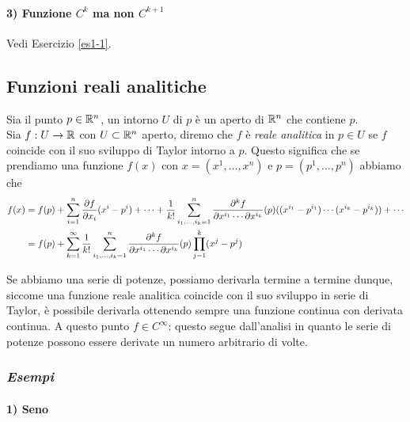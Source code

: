 \paragraph{3) Funzione $ C^{k} $ ma non $ C^{k+1} $}

Vedi Esercizio \ref{es1-1}.

\subsection{Funzioni reali analitiche}

Sia il punto $ p \in \mathbb{R}^{n} $, un intorno $ U $ di $ p $ è un aperto di $ \mathbb{R}^{n} $ che contiene $ p $.\\
Sia $ f : U \to \mathbb{R} $ con $ U \subset \mathbb{R}^{n} $ aperto, diremo che $ f $ è \textit{reale analitica} in $ p \in U $ se $ f $ coincide con il suo sviluppo di Taylor intorno a $ p $. Questo significa che se prendiamo una funzione $ f (x) $ con $ x = (x^{1}, \dots, x^{n}) $ e $ p = (p^{1}, \dots, p^{n}) $ abbiamo che
\begin{align}
	\begin{split}
		f (x) &= f (p) + \sum_{i=1}^{n} \pdv{f}{x_{i}} (p) (x^{i} - p^{i}) + \cdots + \dfrac{1}{k!} \sum_{i_{1},\dots,i_{k}=1}^{n} \dfrac{\partial^{k} f}{\partial x^{i_{1}} \cdots \partial x^{i_{k}}} (p) ( (x^{i_{1}} - p^{i_{1}}) \cdots (x^{i_{k}} - p^{i_{k}}) ) + \cdots\\
		&= f (p) + \sum_{k=1}^{\infty} \dfrac{1}{k!} \sum_{i_{1},\dots,i_{k}=1}^{n} \dfrac{\partial^{k} f}{\partial x^{i_{1}} \cdots \partial x^{i_{k}}} (p) \prod_{j=1}^{k} (x^{j} - p^{j})
	\end{split}
\end{align}

Se abbiamo una serie di potenze, possiamo derivarla termine a termine dunque, siccome una funzione reale analitica coincide con il suo sviluppo in serie di Taylor, è possibile derivarla ottenendo sempre una funzione continua con derivata continua. A questo punto $ f \in C^{\infty} $: questo segue dall'analisi in quanto le serie di potenze possono essere derivate un numero arbitrario di volte.

\subsubsection{\textit{Esempi}}

\paragraph{1) Seno}

